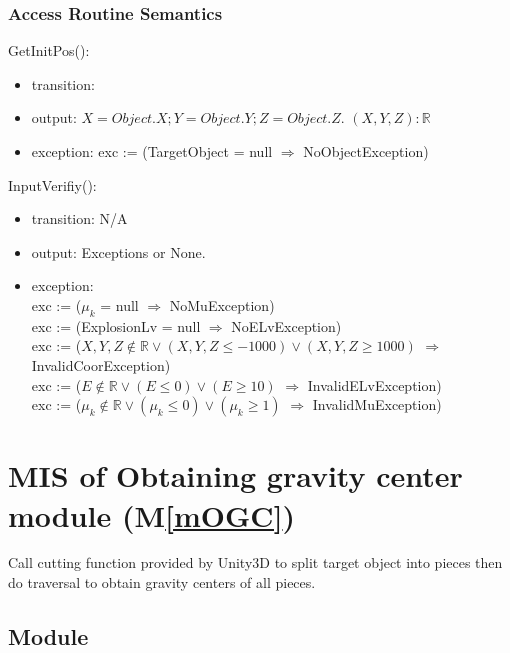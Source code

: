 \documentclass[12pt, titlepage]{article}
\newcommand{\mref}[1]{M\ref{#1}}
\begin{document}
\subsubsection{Access Routine Semantics}

\noindent GetInitPos():
\begin{itemize}
	\item transition: 
	\item output: $X = Object.X; Y = Object.Y; Z = Object.Z$. $(X,Y,Z):\mathbb{R}$ 
	\item exception: exc := (TargetObject = null $\Rightarrow $ NoObjectException)
\end{itemize}

\noindent InputVerifiy():
\begin{itemize}
\item transition: N/A
\item output: Exceptions or None.
\item exception:\\
exc := ($\mu_{k}$ = null $\Rightarrow $ NoMuException)\\
exc := (ExplosionLv = null $\Rightarrow $ NoELvException)\\
exc := ($X,Y,Z \notin \mathbb{R} \vee (X,Y,Z \le -1000) \vee (X,Y,Z \ge 1000)$ $\Rightarrow $ InvalidCoorException)\\
exc := ($E \notin \mathbb{R} \vee (E \leq 0) \vee (E \geq 10)$ $\Rightarrow $ InvalidELvException)\\
exc := ($\mu_{k} \notin \mathbb{R} \vee (\mu_{k} \le 0) \vee (\mu_{k} \ge 1)$ $\Rightarrow $ InvalidMuException)\\
\end{itemize}

\section{MIS of Obtaining gravity center module (\mref{mOGC})} 

Call cutting function provided by Unity3D to split target object into pieces then do traversal to obtain gravity centers of all pieces. 

\subsection{Module}
\end{document}
